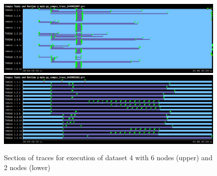 \begin{figure}[h]
\includegraphics[width=\textwidth]{traces/compss_6_piece_tasks.png}
\includegraphics[width=\textwidth]{traces/compss_2_piece_tasks.png}
\caption{Section of traces for execution of dataset 4 with 6 nodes (upper) and 2 nodes (lower)}
\label{fig:scalability}
\end{figure}




 